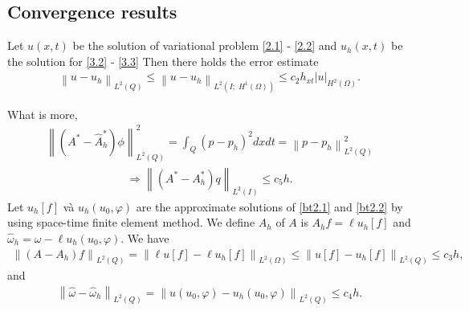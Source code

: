 \documentclass[]{article}
\begin{document}
\subsection{Convergence results}
\begin{dl}\label{dl3.2}
	Let $u(x, t)$ be the solution of variational problem \eqref{2.1} - \eqref{2.2} and $u_h(x, t)$ be the solution for \eqref{3.2} - \eqref{3.3} Then there holds the error estimate
	\begin{align}\label{3.7}
		\left\| u-u_h\right\|_{L^2(Q)}\leq \left\| u-u_h\right\|_{L^2(I;\; H^1(\Omega))}\leq c_2h_{xt} \left|u\right|_{H^2(\Omega)}.
	\end{align}
\end{dl}
\noindent What is more,
\begin{align*}
	\left\| \left(A^*-\hat{A}^*_h\right)\phi\right\|_{L^2(Q)}^2=\int_Q (p-p_h)^2dxdt=\left\| p-p_h\right\|_{L^2(Q)}^2
\end{align*}
\begin{align}\label{3.8}
	\Rightarrow \left\| \left(A^*-A^*_h\right)q\right\|_{L^2(I)}\leq c_5h.
\end{align}
Let $u_h[f]$ và $u_h(u_0, \varphi)$ are the approximate solutions of \cref{bt2.1} and \cref{bt2.2} by using space-time finite element method. We define $A_h$ of $A$ is $A_hf=\ell u_h[f]$ and $\hat{\omega}_h=\omega-\ell u_h(u_0, \varphi)$. We have
\begin{align}\label{3.9}
	\left\| \left(A-A_h\right)f\right\|_{L^2(Q)}=\left\| \ell u[f]-\ell u_h[f]\right\|_{L^2(\Omega)}\leq \left\| u[f]-u_h[f]\right\|_{L^2(Q)}\leq c_3h,
\end{align}
and 
\begin{align}\label{3.10}
	\left\| \hat{\omega}-\hat{\omega}_h\right\|_{L^2(Q)}=\left\| u(u_0,\varphi)-u_h(u_0, \varphi)\right\|_{L^2(Q)}\leq c_4h.
\end{align}
\end{document}
